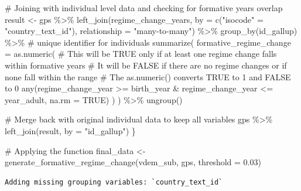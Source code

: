 \documentclass[
  letterpaper,
  DIV=11,
  numbers=noendperiod]{scrartcl}
\newenvironment{Shaded}{\begin{snugshade}}{\end{snugshade}}
\newcommand{\AttributeTok}[1]{\textcolor[rgb]{0.40,0.45,0.13}{#1}}
\newcommand{\CommentTok}[1]{\textcolor[rgb]{0.37,0.37,0.37}{#1}}
\newcommand{\ConstantTok}[1]{\textcolor[rgb]{0.56,0.35,0.01}{#1}}
\newcommand{\FloatTok}[1]{\textcolor[rgb]{0.68,0.00,0.00}{#1}}
\newcommand{\FunctionTok}[1]{\textcolor[rgb]{0.28,0.35,0.67}{#1}}
\newcommand{\NormalTok}[1]{\textcolor[rgb]{0.00,0.23,0.31}{#1}}
\newcommand{\OtherTok}[1]{\textcolor[rgb]{0.00,0.23,0.31}{#1}}
\newcommand{\SpecialCharTok}[1]{\textcolor[rgb]{0.37,0.37,0.37}{#1}}
\newcommand{\StringTok}[1]{\textcolor[rgb]{0.13,0.47,0.30}{#1}}
\begin{document}
\begin{Shaded}
\begin{Highlighting}[]
\CommentTok{\# Joining with individual level data and checking for formative years overlap}
\NormalTok{  result }\OtherTok{\textless{}{-}}\NormalTok{ gps }\SpecialCharTok{\%\textgreater{}\%}
    \FunctionTok{left\_join}\NormalTok{(regime\_change\_years,}
            \AttributeTok{by =} \FunctionTok{c}\NormalTok{(}\StringTok{"isocode"} \OtherTok{=} \StringTok{"country\_text\_id"}\NormalTok{),}
            \AttributeTok{relationship =} \StringTok{"many{-}to{-}many"}\NormalTok{) }\SpecialCharTok{\%\textgreater{}\%}
    \FunctionTok{group\_by}\NormalTok{(id\_gallup) }\SpecialCharTok{\%\textgreater{}\%} \CommentTok{\# unique identifier for individuals}
    \FunctionTok{summarize}\NormalTok{(}
      \AttributeTok{formative\_regime\_change =} \FunctionTok{as.numeric}\NormalTok{(}
      \CommentTok{\# This will be TRUE only if at least one regime change falls within formative years}
      \CommentTok{\# It will be FALSE if there are no regime changes or if none fall within the range}
      \CommentTok{\# The as.numeric() converts TRUE to 1 and FALSE to 0}
        \FunctionTok{any}\NormalTok{(regime\_change\_year }\SpecialCharTok{\textgreater{}=}\NormalTok{ birth\_year }\SpecialCharTok{\&} 
\NormalTok{              regime\_change\_year }\SpecialCharTok{\textless{}=}\NormalTok{ year\_adult, }
            \AttributeTok{na.rm =} \ConstantTok{TRUE}\NormalTok{)}
\NormalTok{        )}
\NormalTok{      ) }\SpecialCharTok{\%\textgreater{}\%}
    \FunctionTok{ungroup}\NormalTok{()}

\CommentTok{\# Merge back with original individual data to keep all variables}
\NormalTok{  gps }\SpecialCharTok{\%\textgreater{}\%}
    \FunctionTok{left\_join}\NormalTok{(result, }\AttributeTok{by =} \StringTok{"id\_gallup"}\NormalTok{)}
\NormalTok{\}}

\CommentTok{\# Applying the function}
\NormalTok{final\_data }\OtherTok{\textless{}{-}} \FunctionTok{generate\_formative\_regime\_change}\NormalTok{(vdem\_sub, gps, }\AttributeTok{threshold =} \FloatTok{0.03}\NormalTok{)}
\end{Highlighting}
\end{Shaded}

\begin{verbatim}
Adding missing grouping variables: `country_text_id`
\end{verbatim}
\end{document}

